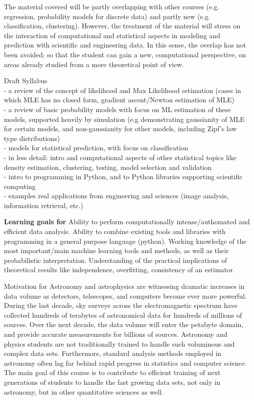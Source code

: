 The material covered will be partly overlapping with other courses
(e.g. regression, probability models for discrete data) and partly new
(e.g. classification, clustering). However, the treatment of the
material will stress on the interaction of computational and
statistical aspects in modeling and prediction with scientific and
engineering data. In this sense, the overlap has not been avoided; so that
the student can gain a new, computational perspective, on areas
already studied from a more theoretical point of view. 

\bit
\item \statcl Draft Syllabus\\
- a review of the concept of likelihood and Max Likelihood estimation (cases in which MLE has no closed form, gradient ascent/Newton estimation of MLE)\\
- a review of basic probability models with focus on ML estimation of these models, supported heavily by simulation (e.g demonstrating gaussianity of MLE for certain models, and non-gaussianity for other models, including Zipf's law type distributions)\\
- models for statistical prediction, with focus on classification\\
- in less detail: intro and computational aspects of other statistical topics like density estimation, clustering, testing, model selection and validation\\
- intro to programming in Python, and to Python libraries supporting scientific computing\\
- examples real applications from engineering and sciences (image analysis, information retrieval, etc.)


\item[]{\bf Learning goals for \statcl} Ability to perform computationally intense/authomated and efficient data analysis. Ability to combine existing tools and libraries with programming in a general purpose language (python). 
Working knowledge of the most important/main machine learning tools and methods, as well as their probabilistic interpretation. Understanding of the practical implications of theoretical results like independence, overfitting, consistency of an estimator. 

\item{Motivation for \astrocl} 
Astronomy and astrophysics are witnessing dramatic increases in data volume 
as detectors, telescopes, and computers become ever more powerful. During the 
last decade, sky surveys across the electromagnetic spectrum have collected 
hundreds of terabytes of astronomical data for hundreds of millions of sources. 
Over the next decade, the data volume will enter the petabyte domain, and provide 
accurate measurements for billions of sources. Astronomy and physics students 
are not traditionally trained to handle such voluminous and complex data sets. 
Furthermore, standard analysis methods employed in astronomy often lag far 
behind rapid progress in statistics and computer science. The main
goal of this course is to contribute to efficient training of next
generations of students to 
handle the fast growing data sets, not only in astronomy, but in other quantitative 
sciences as well. 


